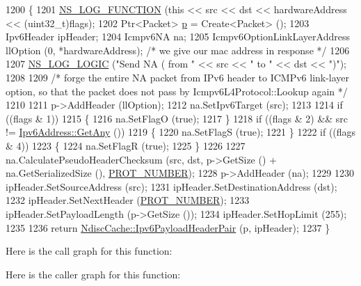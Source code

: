 \begin{DoxyCode}
1200 \{
1201   \hyperlink{log-macros-disabled_8h_a90b90d5bad1f39cb1b64923ea94c0761}{NS\_LOG\_FUNCTION} (\textcolor{keyword}{this} << src << dst << hardwareAddress << (uint32\_t)flags);
1202   Ptr<Packet> \hyperlink{lte__link__budget_8m_ac9de518908a968428863f829398a4e62}{p} = Create<Packet> ();
1203   Ipv6Header ipHeader;
1204   Icmpv6NA na;
1205   Icmpv6OptionLinkLayerAddress llOption (0, *hardwareAddress);  \textcolor{comment}{/* we give our mac address in response */}
1206 
1207   \hyperlink{group__logging_ga88acd260151caf2db9c0fc84997f45ce}{NS\_LOG\_LOGIC} (\textcolor{stringliteral}{"Send NA ( from "} << src << \textcolor{stringliteral}{" to "} << dst << \textcolor{stringliteral}{")"});
1208 
1209   \textcolor{comment}{/* forge the entire NA packet from IPv6 header to ICMPv6 link-layer option, so that the packet does not
       pass by Icmpv6L4Protocol::Lookup again */}
1210 
1211   p->AddHeader (llOption);
1212   na.SetIpv6Target (src);
1213 
1214   \textcolor{keywordflow}{if} ((flags & 1))
1215     \{
1216       na.SetFlagO (\textcolor{keyword}{true});
1217     \}
1218   \textcolor{keywordflow}{if} ((flags & 2) && src != \hyperlink{classns3_1_1Ipv6Address_a2783e8badfc98c8b0a8508bba6e1b91e}{Ipv6Address::GetAny} ())
1219     \{
1220       na.SetFlagS (\textcolor{keyword}{true});
1221     \}
1222   \textcolor{keywordflow}{if} ((flags & 4))
1223     \{
1224       na.SetFlagR (\textcolor{keyword}{true});
1225     \}
1226 
1227   na.CalculatePseudoHeaderChecksum (src, dst, p->GetSize () + na.GetSerializedSize (), 
      \hyperlink{classns3_1_1Icmpv6L4Protocol_aa56c41a886a45b8b4f22a19afc827e2d}{PROT\_NUMBER});
1228   p->AddHeader (na);
1229 
1230   ipHeader.SetSourceAddress (src);
1231   ipHeader.SetDestinationAddress (dst);
1232   ipHeader.SetNextHeader (\hyperlink{classns3_1_1Icmpv6L4Protocol_aa56c41a886a45b8b4f22a19afc827e2d}{PROT\_NUMBER});
1233   ipHeader.SetPayloadLength (p->GetSize ());
1234   ipHeader.SetHopLimit (255);
1235 
1236   \textcolor{keywordflow}{return} \hyperlink{classns3_1_1NdiscCache_a29c07f4c9da0e923f442f6440666240e}{NdiscCache::Ipv6PayloadHeaderPair} (p, ipHeader);
1237 \}
\end{DoxyCode}


Here is the call graph for this function\+:




Here is the caller graph for this function\+:


